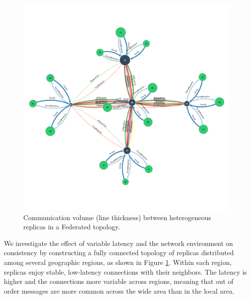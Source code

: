 \documentclass[10pt,conference,letterpaper]{IEEEtran}
\begin{document}
\begin{figure}
    \centering
      \includegraphics[width=\linewidth]{figures/federated_sync}
    \caption{Communication volume (line thickness) between  heterogeneous replicas in a Federated topology.}
    \label{fig:topology}
\end{figure}

We investigate the effect of variable latency and the network environment on consistency by
constructing a fully connected topology of replicas distributed among several
geographic regions, as shown in Figure \ref{fig:topology}.
Within each region, replicas enjoy stable, low-latency connections with their
neighbors.
The latency is higher and the connections more variable across regions, meaning that
out of order messages are more common across the wide area than in the local area.
\end{document}
